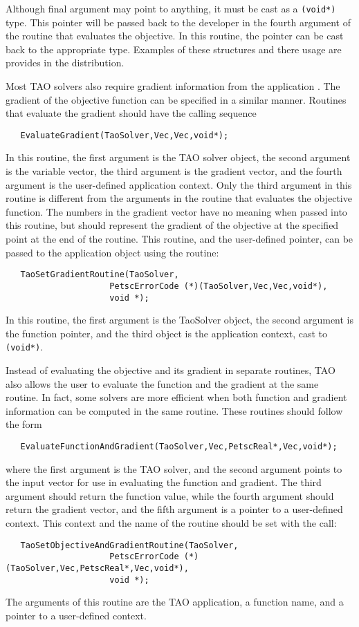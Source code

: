 Although final argument may point to anything, it must be cast as a {\tt (void*)} type.
This pointer will be passed back to the developer in the fourth argument of the
routine that evaluates the objective.  In this routine, the pointer can be cast
back to the appropriate type.  Examples of these structures and there usage
are provides in the distribution.


   Most TAO solvers also require gradient information from the 
application .
  The gradient of the objective function can be specified in a similar manner.
Routines that evaluate the gradient should have the calling sequence
\begin{verbatim}
   EvaluateGradient(TaoSolver,Vec,Vec,void*);
\end{verbatim}
\noindent
In this routine, the first
argument is the TAO solver object, the second argument is the variable
vector, the third argument is the gradient vector, and the fourth argument is
the user-defined application context.  Only the third argument in this
routine is different from the arguments in the routine that evaluates
the objective function.  The numbers in the gradient vector have no
meaning when passed into this routine, but should represent the gradient
of the objective at the specified point at the end of the routine.
This routine, and the user-defined pointer, can be passed to the application
object using the routine: 
\begin{verbatim}
   TaoSetGradientRoutine(TaoSolver,
                     PetscErrorCode (*)(TaoSolver,Vec,Vec,void*),
                     void *);
\end{verbatim}
\noindent
In this routine, the first argument is the TaoSolver object, the second argument
is the function pointer, and the third object is the application context, cast
to {\tt (void*)}.

   Instead of evaluating the objective and its gradient in separate
routines, TAO also allows the user to evaluate the function and the gradient
at the same routine.  In fact, some solvers are more efficient when
both function and gradient information can be computed in the same routine.
These routines should follow the form
\begin{verbatim}
   EvaluateFunctionAndGradient(TaoSolver,Vec,PetscReal*,Vec,void*);
\end{verbatim}
\noindent
where the first
argument is the TAO solver, and the second
argument points to the input vector for use in evaluating the
function and gradient. The third argument should return the
function value, while the fourth argument should return the gradient vector,
and the fifth argument is a pointer to a user-defined context.
This context and the name of the routine should be set with the
call: 
\begin{verbatim}
   TaoSetObjectiveAndGradientRoutine(TaoSolver,
                     PetscErrorCode (*)(TaoSolver,Vec,PetscReal*,Vec,void*),
                     void *);
\end{verbatim}
\noindent
The arguments of this routine are the TAO application, a
function name, and a pointer to a user-defined context.


